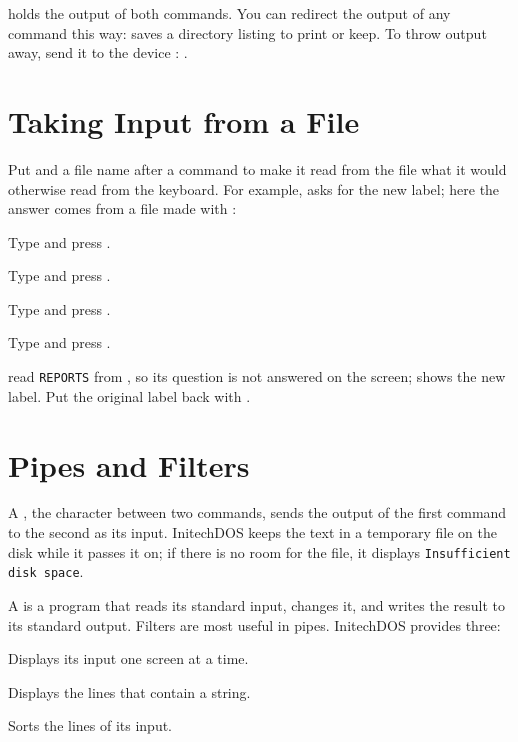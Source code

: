 
 holds the output of both commands.  You can redirect the
output of any command this way:  saves a directory
listing to print or keep.  To throw output away, send it to the device
: .

\section{Taking Input from a File}
Put \type{<} and a file name after a command to make it read from the file
what it would otherwise read from the keyboard.  For example, 
asks for the new label; here the answer comes from a file made with
:
\begin{Steps}
\item Type  and press .
\item Type  and press .
\item Type  and press .
\item Type  and press .
\end{Steps}


 read \texttt{REPORTS} from , so its question is
not answered on the screen;  shows the new label.  Put the original
label back with .

\section{Pipes and Filters}
A , the character \type{|} between two commands, sends the output
of the first command to the second as its input.  InitechDOS keeps the text
in a temporary file on the disk while it passes it on; if there is no room
for the file, it displays \texttt{Insufficient disk space}.

A  is a program that reads its standard input, changes it, and
writes the result to its standard output.  Filters are most useful in
pipes.
InitechDOS provides three:

Displays its input one screen at a time.  

Displays the lines that contain a string.  

Sorts the lines of its input.  
